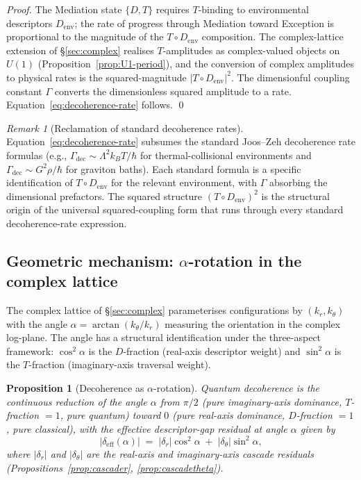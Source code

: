 \documentclass[11pt,a4paper]{article}
\newtheorem{proposition}[theorem]{Proposition}
\theoremstyle{definition}
\theoremstyle{remark}
\newtheorem{remark}[theorem]{Remark}
\begin{document}
\begin{proof}
The Mediation state $\{D,T\}$ requires $T$-binding to environmental descriptors $D_{\mathrm{env}}$; the rate of progress through Mediation toward Exception is proportional to the magnitude of the $T \circ D_{\mathrm{env}}$ composition. The complex-lattice extension of \S\ref{sec:complex} realises $T$-amplitudes as complex-valued objects on $U(1)$ (Proposition~\ref{prop:U1-period}), and the conversion of complex amplitudes to physical rates is the squared-magnitude $|T \circ D_{\mathrm{env}}|^{2}$. The dimensionful coupling constant $\Gamma$ converts the dimensionless squared amplitude to a rate. Equation~\eqref{eq:decoherence-rate} follows. \qed
\end{proof}

\begin{remark}[Reclamation of standard decoherence rates]\label{rem:decoherence-rate-reclaim}
Equation~\eqref{eq:decoherence-rate} subsumes the standard Joos--Zeh decoherence rate formulas (e.g., $\Gamma_{\mathrm{dec}} \sim \Lambda^{2} k_{B} T/\hbar$ for thermal-collisional environments and $\Gamma_{\mathrm{dec}} \sim G^{2}\rho/\hbar$ for graviton baths). Each standard formula is a specific identification of $T \circ D_{\mathrm{env}}$ for the relevant environment, with $\Gamma$ absorbing the dimensional prefactors. The squared structure $(T \circ D_{\mathrm{env}})^{2}$ is the structural origin of the universal squared-coupling form that runs through every standard decoherence-rate expression.
\end{remark}

\subsection{Geometric mechanism: \texorpdfstring{$\alpha$-rotation}{alpha-rotation} in the complex lattice}\label{subsec:alpha-rotation}

The complex lattice of \S\ref{sec:complex} parameterises configurations by $(k_{r}, k_{\theta})$ with the angle $\alpha = \arctan(k_{\theta}/k_{r})$ measuring the orientation in the complex log-plane. The angle has a structural identification under the three-aspect framework: $\cos^{2}\alpha$ is the $D$-fraction (real-axis descriptor weight) and $\sin^{2}\alpha$ is the $T$-fraction (imaginary-axis traversal weight).

\begin{proposition}[Decoherence as $\alpha$-rotation]\label{prop:alpha-rotation}
Quantum decoherence is the continuous reduction of the angle $\alpha$ from $\pi/2$ (pure imaginary-axis dominance, $T$-fraction $= 1$, pure quantum) toward $0$ (pure real-axis dominance, $D$-fraction $= 1$, pure classical), with the effective descriptor-gap residual at angle $\alpha$ given by
\begin{equation}\label{eq:eff-descriptor-gap}
|\delta_{\mathrm{eff}}(\alpha)| \;=\; |\delta_{r}|\cos^{2}\alpha \;+\; |\delta_{\theta}|\sin^{2}\alpha,
\end{equation}
where $|\delta_{r}|$ and $|\delta_{\theta}|$ are the real-axis and imaginary-axis cascade residuals (Propositions~\ref{prop:cascader}, \ref{prop:cascadetheta}).
\end{proposition}
\end{document}
